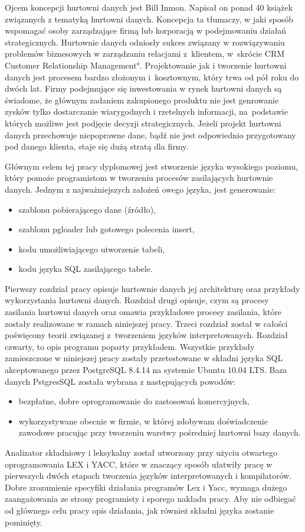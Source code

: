 Ojcem koncepcji hurtowni danych jest Bill Inmon.
Napisał on ponad 40 książek związanych z tematyką hurtowni danych.
Koncepcja ta tłumaczy,
 w jaki sposób wspomagać osoby zarządzające firmą lub korporacją w podejmowaniu działań strategicznych.
Hurtownie danych odniosły sukces związany w rozwiązywaniu problemów biznesowych w zarządzaniu relacjami z~klientem,
 w~skrócie CRM \ang{Customer Relationship Management}.
Projektowanie jak i tworzenie hurtowni danych jest procesem bardzo złożonym i~kosztownym,
 który trwa od pół roku do dwóch lat. Firmy podejmujące się inwestowania w rynek hurtowni danych są świadome, 
 że głównym zadaniem zakupionego produktu nie jest genrowanie zysków tylko dostarczanie wiarygodnych i rzetelnych informacji, 
 na~podstawie których możliwe jest podjęcie decyzji strategicznych.
Jeżeli projekt hurtowni danych przechowuje niepoprawne dane, 
 bądź nie jest odpowiednio przygotowany pod danego klienta, staje się dużą stratą dla firmy.\cite{TodMan}

Głównym celem tej pracy dyplomowej jest stworzenie języka wysokiego poziomu,
 który pomoże programistom w tworzeniu procesów zasilających hurtownie danych.
 Jednym z najważniejszych założeń owego języka, jest generowanie:

\begin{itemize}
 \item szablonu pobierającego dane (źródło),
 \item szablonu pgloader lub gotowego polecenia insert,
 \item kodu umożliwiającego utworzenie tabeli,
 \item kodu języka SQL zasilającego tabele.
\end{itemize}

Pierwszy rozdział pracy opisuje hurtownie danych jej architekturę oraz przykłady wykorzystania hurtowni danych.
Rozdział drugi opisuje,
 czym są procesy zasilania hurtowni danych oraz omawia przykładowe procesy zasilania,
 które zostały realizowane w ramach niniejszej pracy.
Trzeci rozdział został w całości poświęcony teorii związanej z~tworzeniem języków interpretowanych.
Rozdział czwarty, to opis programu poparty przykładem.
Wszystkie przykłady zamieszczone w niniejszej pracy zostały przetestowane w składni języka SQL akceptowanego 
przez PostgreSQL 8.4.14 na systemie Ubuntu 10.04 LTS. 
Baza danych PstgresSQL została wybrana z następujących powodów:
\begin{itemize}
 \item bezpłatne, dobre oprogramowanie do zastosowań komercyjnych,
 \item wykorzystywane obecnie w firmie,
    w której zdobywam doświadczenie zawodowe pracując przy tworzeniu warstwy pośredniej hurtowni bazy danych.
\end{itemize}

Analizator składniowy i leksykalny został utworzony przy użyciu otwartego oprogramowania LEX i YACC, 
 które w znaczący sposób ułatwiły pracę w pierwszych dwóch etapach tworzenia języków interpretowanych i kompilatorów.
Dobre zrozumienie specyfiki działania programów Lex i Yacc, wymaga dużego zaangażowania ze strony programisty i sporego nakładu pracy.
Aby nie odbiegać od głównego celu pracy opis działania, jak również składni języka zostanie pominięty.

